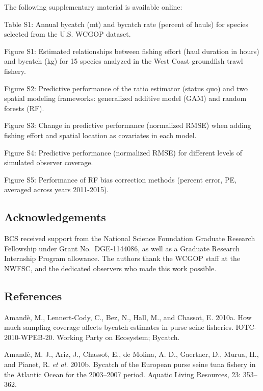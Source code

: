 \documentclass[]{article}
\begin{document}
The following supplementary material is available online:

Table S1: Annual bycatch (mt) and bycatch rate (percent of hauls) for
species selected from the U.S. WCGOP dataset.

Figure S1: Estimated relationships between fishing effort (haul duration
in hours) and bycatch (kg) for 15 species analyzed in the West Coast
groundfish trawl fishery.

Figure S2: Predictive performance of the ratio estimator (status quo)
and two spatial modeling frameworks: generalized additive model (GAM)
and random forests (RF).

Figure S3: Change in predictive performance (normalized RMSE) when
adding fishing effort and spatial location as covariates in each model.

Figure S4: Predictive performance (normalized RMSE) for different levels
of simulated observer coverage.

Figure S5: Performance of RF bias correction methods (percent error, PE,
averaged across years 2011-2015).

\hypertarget{acknowledgements}{%
\subsection{Acknowledgements}\label{acknowledgements}}

BCS received support from the National Science Foundation Graduate
Research Fellowship under Grant No.~DGE-1144086, as well as a Graduate
Research Internship Program allowance. The authors thank the WCGOP staff
at the NWFSC, and the dedicated observers who made this work possible.

\hypertarget{references}{%
\subsection{References}\label{references}}

\hypertarget{refs}{}
\leavevmode\hypertarget{ref-amande2010b}{}%
Amandè, M., Lennert-Cody, C., Bez, N., Hall, M., and Chassot, E. 2010a.
How much sampling coverage affects bycatch estimates in purse seine
fisheries. IOTC-2010-WPEB-20. Working Party on Ecosystem; Bycatch.

\leavevmode\hypertarget{ref-amande2010a}{}%
Amandè, M. J., Ariz, J., Chassot, E., de Molina, A. D., Gaertner, D.,
Murua, H., and Pianet, R. \emph{et al.} 2010b. Bycatch of the European
purse seine tuna fishery in the Atlantic Ocean for the 2003--2007
period. Aquatic Living Resources, 23: 353--362.
\end{document}
